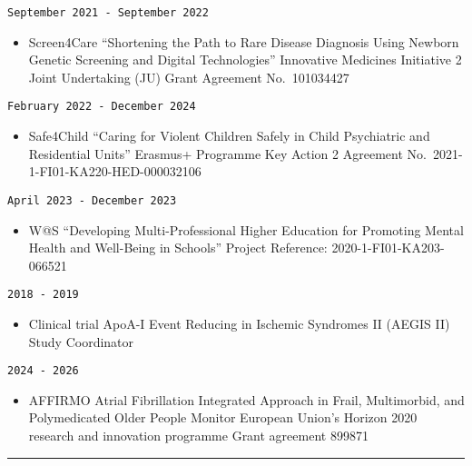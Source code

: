 \documentclass[
  12pt,
  letterpaper,
  DIV=11,
  numbers=noendperiod]{scrartcl}
\providecommand{\tightlist}{%
  \setlength{\itemsep}{0pt}\setlength{\parskip}{0pt}}\usepackage{longtable,booktabs,array}
\begin{document}
\texttt{September\ 2021\ -\ September\ 2022}

\begin{itemize}
\tightlist
\item
  Screen4Care \textbar{} ``Shortening the Path to Rare Disease Diagnosis
  Using Newborn Genetic Screening and Digital Technologies'' \textbar{}
  Innovative Medicines Initiative 2 Joint Undertaking (JU) \textbar{}
  Grant Agreement No.~101034427
\end{itemize}

\texttt{February\ 2022\ -\ December\ 2024}

\begin{itemize}
\tightlist
\item
  Safe4Child \textbar{} ``Caring for Violent Children Safely in Child
  Psychiatric and Residential Units'' \textbar{} Erasmus+ Programme
  \textbar{} Key Action 2 \textbar{} Agreement
  No.~2021-1-FI01-KA220-HED-000032106
\end{itemize}

\texttt{April\ 2023\ -\ December\ 2023}

\begin{itemize}
\tightlist
\item
  W@S \textbar{} ``Developing Multi-Professional Higher Education for
  Promoting Mental Health and Well-Being in Schools'' \textbar{} Project
  Reference: 2020-1-FI01-KA203-066521
\end{itemize}

\texttt{2018\ -\ 2019}

\begin{itemize}
\tightlist
\item
  Clinical trial \textbar{} ApoA-I Event Reducing in Ischemic Syndromes
  II (AEGIS II) \textbar{} Study Coordinator
\end{itemize}

\texttt{2024\ -\ 2026}

\begin{itemize}
\tightlist
\item
  AFFIRMO \textbar{} Atrial Fibrillation Integrated Approach in Frail,
  Multimorbid, and Polymedicated Older People \textbar{} Monitor
  \textbar{} European Union's Horizon 2020 research and innovation
  programme \textbar{} Grant agreement 899871
\end{itemize}

\begin{center}\rule{0.5\linewidth}{0.5pt}\end{center}
\end{document}
